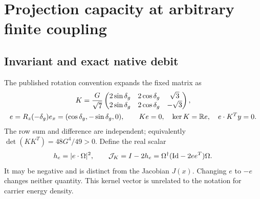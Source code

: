 \section{Projection capacity at arbitrary finite coupling}\label{sec:projection}
\subsection{Invariant and exact native debit}
The published rotation convention expands the fixed matrix as
\begin{equation}\label{eq:kernel}%
\begin{gathered}
K=\frac G{\sqrt7}
\begin{pmatrix}2\sin\delta_g&2\cos\delta_g&\sqrt3\\
2\sin\delta_g&2\cos\delta_g&-\sqrt3\end{pmatrix},\\
e=R_z(-\delta_g)e_x=(\cos\delta_g,-\sin\delta_g,0),\qquad
Ke=0,\quad \ker K=\R e,\quad e\cdot K^Ty=0 .
\end{gathered}
\end{equation}
The row sum and difference are independent; equivalently $\det(KK^T)=48G^4/49>0$. Define the real scalar
\begin{equation}\label{eq:projectiondef}%
h_e=|e\cdot\Omega|^2,\qquad
\Jk=I-2h_e=\Omega^\dagger(\mathrm{Id}-2ee^T)\Omega .
\end{equation}
It may be negative and is distinct from the Jacobian $J(x)$. Changing $e$ to $-e$ changes neither quantity. This kernel vector is unrelated to the notation for carrier energy density.

